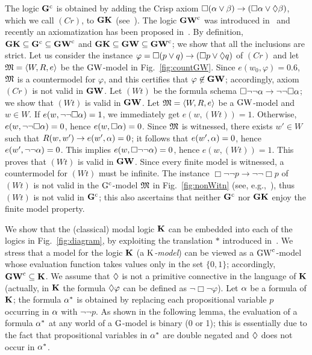 \noindent
The logic $\mathbf{G}^\mathrm{c}$ is obtained by adding the Crisp axiom
$\Box(\alpha\lor\beta)\to (\Box \alpha \lor \lozenge \beta)$, which we call $(Cr)$, to
$\mathbf{GK}$ (see~\cite{RodriguezV:21}).  The logic $\mathbf{GW}^\mathrm{c}$ was introduced
in~\cite{FerFioRod:2025} and recently an axiomatization has been
proposed in~\cite{RV26}.  By definition,
$\mathbf{GK}\subseteq\mathbf{G}^\mathrm{c}\subseteq\mathbf{GW}^\mathrm{c}$ and
$\mathbf{GK}\subseteq\mathbf{GW}\subseteq\mathbf{GW}^\mathrm{c}$; we show that all the inclusions are
strict.  Let us consider the instance $\varphi =\Box (p\lor q)\to
(\Box p \lor \lozenge q)$ of $(Cr)$ and let $\mathfrak{M}=\langle W,R,e \rangle$ be the
$\mbox{$\mathrm{GW}$}$-model in Fig.~\ref{fig:countGW}.  Since $e(w_0,\varphi) = 0.6$,
$\mathfrak{M}$ is a countermodel for $\varphi$, and this certifies that
$\varphi\not\in\mathbf{GW}$; accordingly, axiom $(Cr)$ is not valid in
$\mathbf{GW}$.  Let $(Wt)$ be the formula schema $\Box \neg\neg \alpha\to
\neg\neg \Box \alpha$; we show that $(Wt)$ is valid in $\mathbf{GW}$.  Let
$\mathfrak{M}=\langle W,R,e \rangle$ be a $\mbox{$\mathrm{GW}$}$-model and $w\in W$.  If $e(w, \neg\neg
\Box \alpha)=1$, we immediately get $e(w, (Wt))=1$. Otherwise, $e(w,
\neg\neg \Box \alpha)=0$, hence $e(w, \Box \alpha)=0$.  Since $\mathfrak{M}$ is
witnessed, there exists $w'\in W$ such that $R(w,w') \to e(w',\alpha) =
0$; it follows that $e(w',\alpha)=0$, hence $e(w',\neg \neg \alpha)=0$.  This
implies $e(w, \Box\neg \neg \alpha)=0$, hence $e(w, (Wt)) = 1$. This
proves that $(Wt)$ is valid in $\mathbf{GW}$.  Since every finite model is
witnessed, a countermodel for $(Wt)$ must be infinite.  The instance
$\Box \neg\neg p\to \neg\neg \Box p$ of $(Wt)$ is not valid in the
$\mbox{$\mathrm{G}^\mathrm{c}$}$-model $\mathfrak{M}$ in Fig.~\ref{fig:nonWitn} (see,
e.g.,~\cite{FerFioRod:2025}), thus $(Wt)$ is not valid in $\mathbf{G}^\mathrm{c}$; this
also ascertains that neither $\mathbf{G}^\mathrm{c}$ nor $\mathbf{GK}$ enjoy the finite model
property.

We show that the (classical) modal logic $\mathbf{K}$ can be embedded into
each of the logics in Fig.~\ref{fig:diagram}, by exploiting the
translation $*$ introduced in~\cite{MetOli1}.  We stress that a model
for the logic $\mathbf{K}$ (a \emph{$\mbox{$\mathrm{K}$}$-model}) can be viewed as a
$\mbox{$\mathrm{GW}^\mathrm{c}$}$-model whose evaluation function takes values only in the set
$\{0,1\}$; accordingly, $\mathbf{GW}^\mathrm{c}\subseteq\mathbf{K}$.  We assume that $\lozenge$
is not a primitive connective in the language of $\mathbf{K}$ (actually, in
$\mathbf{K}$ the formula $\lozenge\varphi$ can be defined as
$\neg\Box\neg\varphi$).  Let $\alpha$ be a formula of $\mathbf{K}$; the formula
$\alpha^*$ is obtained by replacing each propositional variable $p$
occurring in $\alpha$ with $\neg\neg p$.  As shown in the following lemma,
the evaluation of a formula $\alpha^*$ at any world of a $\mbox{$\mathrm{G}$}$-model is
binary (0 or 1); this is essentially due to the fact that
propositional variables in $\alpha^*$ are double negated and $\lozenge$ does
not occur in $\alpha^*$.


